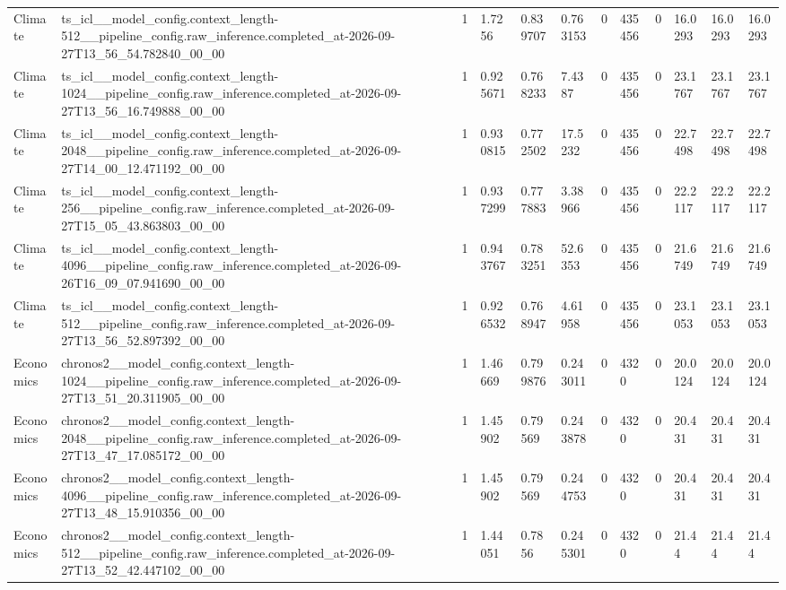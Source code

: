 \begin{tabular}{llllllllllll}
Climate & ts\_icl\_\_model\_config.context\_length-512\_\_pipeline\_config.raw\_inference.completed\_at-2026-09-27T13\_56\_54.782840\_00\_00 & 1 & 1.7256 & 0.839707 & 0.763153 & 0 & 435456 & 0 & 16.0293 & 16.0293 & 16.0293 \\
Climate & ts\_icl\_\_model\_config.context\_length-1024\_\_pipeline\_config.raw\_inference.completed\_at-2026-09-27T13\_56\_16.749888\_00\_00 & 1 & 0.925671 & 0.768233 & 7.4387 & 0 & 435456 & 0 & 23.1767 & 23.1767 & 23.1767 \\
Climate & ts\_icl\_\_model\_config.context\_length-2048\_\_pipeline\_config.raw\_inference.completed\_at-2026-09-27T14\_00\_12.471192\_00\_00 & 1 & 0.930815 & 0.772502 & 17.5232 & 0 & 435456 & 0 & 22.7498 & 22.7498 & 22.7498 \\
Climate & ts\_icl\_\_model\_config.context\_length-256\_\_pipeline\_config.raw\_inference.completed\_at-2026-09-27T15\_05\_43.863803\_00\_00 & 1 & 0.937299 & 0.777883 & 3.38966 & 0 & 435456 & 0 & 22.2117 & 22.2117 & 22.2117 \\
Climate & ts\_icl\_\_model\_config.context\_length-4096\_\_pipeline\_config.raw\_inference.completed\_at-2026-09-26T16\_09\_07.941690\_00\_00 & 1 & 0.943767 & 0.783251 & 52.6353 & 0 & 435456 & 0 & 21.6749 & 21.6749 & 21.6749 \\
Climate & ts\_icl\_\_model\_config.context\_length-512\_\_pipeline\_config.raw\_inference.completed\_at-2026-09-27T13\_56\_52.897392\_00\_00 & 1 & 0.926532 & 0.768947 & 4.61958 & 0 & 435456 & 0 & 23.1053 & 23.1053 & 23.1053 \\
Economics & chronos2\_\_model\_config.context\_length-1024\_\_pipeline\_config.raw\_inference.completed\_at-2026-09-27T13\_51\_20.311905\_00\_00 & 1 & 1.46669 & 0.799876 & 0.243011 & 0 & 4320 & 0 & 20.0124 & 20.0124 & 20.0124 \\
Economics & chronos2\_\_model\_config.context\_length-2048\_\_pipeline\_config.raw\_inference.completed\_at-2026-09-27T13\_47\_17.085172\_00\_00 & 1 & 1.45902 & 0.79569 & 0.243878 & 0 & 4320 & 0 & 20.431 & 20.431 & 20.431 \\
Economics & chronos2\_\_model\_config.context\_length-4096\_\_pipeline\_config.raw\_inference.completed\_at-2026-09-27T13\_48\_15.910356\_00\_00 & 1 & 1.45902 & 0.79569 & 0.244753 & 0 & 4320 & 0 & 20.431 & 20.431 & 20.431 \\
Economics & chronos2\_\_model\_config.context\_length-512\_\_pipeline\_config.raw\_inference.completed\_at-2026-09-27T13\_52\_42.447102\_00\_00 & 1 & 1.44051 & 0.7856 & 0.245301 & 0 & 4320 & 0 & 21.44 & 21.44 & 21.44 \\

\end{tabular}
